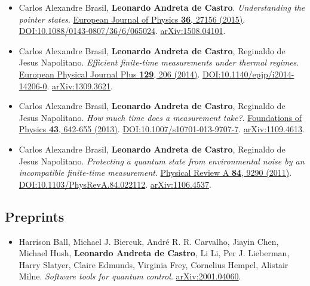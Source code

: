\documentclass[a4paper]{article}
\begin{document}
\begin{itemize}
\item[]  Carlos Alexandre Brasil, \textbf{Leonardo Andreta de Castro}. \textit{Understanding the pointer states}. \href{https://iopscience.iop.org/article/10.1088/0143-0807/36/6/065024}{ European Journal of Physics \textbf{36}, 27156 (2015)}. \href{https://doi.org/10.1088/0143-0807/36/6/065024}{DOI:10.1088/0143-0807/36/6/065024}. \href{https://arxiv.org/abs/1508.04101}{arXiv:1508.04101}.  
\item[]  Carlos Alexandre Brasil, \textbf{Leonardo Andreta de Castro}, Reginaldo de Jesus Napolitano. \textit{Efficient finite-time measurements under thermal regimes}. \href{https://link.springer.com/article/10.1140/epjp/i2014-14206-0}{ European Physical Journal Plus \textbf{129}, 206 (2014)}. \href{https://doi.org/10.1140/epjp/i2014-14206-0}{DOI:10.1140/epjp/i2014-14206-0}. \href{https://arxiv.org/abs/1309.3621}{arXiv:1309.3621}.  
\item[]  Carlos Alexandre Brasil, \textbf{Leonardo Andreta de Castro}, Reginaldo de Jesus Napolitano. \textit{How much time does a measurement take?}. \href{https://link.springer.com/article/10.1007%2Fs10701-013-9707-7}{ Foundations of Physics \textbf{43}, 642-655 (2013)}. \href{https://doi.org/10.1007/s10701-013-9707-7}{DOI:10.1007/s10701-013-9707-7}. \href{https://arxiv.org/abs/1109.4613}{arXiv:1109.4613}.  
\item[]  Carlos Alexandre Brasil, \textbf{Leonardo Andreta de Castro}, Reginaldo de Jesus Napolitano. \textit{Protecting a quantum state from environmental noise by an incompatible finite-time measurement}. \href{https://journals.aps.org/pra/abstract/10.1103/PhysRevA.84.022112}{ Physical Review A \textbf{84}, 9290 (2011)}. \href{https://doi.org/10.1103/PhysRevA.84.022112}{DOI:10.1103/PhysRevA.84.022112}. \href{https://arxiv.org/abs/1106.4537}{arXiv:1106.4537}.  
 \end{itemize}\subsection*{Preprints}
\begin{itemize} \item[]  Harrison Ball, Michael J. Biercuk, André R. R. Carvalho, Jiayin Chen, Michael Hush, \textbf{Leonardo Andreta de Castro}, Li Li, Per J. Lieberman, Harry Slatyer, Claire Edmunds, Virginia Frey, Cornelius Hempel, Alistair Milne. \textit{Software tools for quantum control}. \href{https://arxiv.org/abs/2001.04060}{arXiv:2001.04060}.   \end{itemize}
\end{document}
